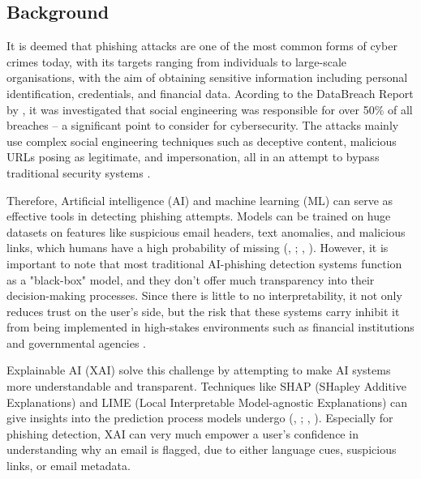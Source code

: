 
\subsection{Background}

It is deemed that phishing attacks are one of the most common forms of cyber crimes today, with its targets ranging from individuals to large-scale organisations, with the aim of obtaining sensitive information including personal identification, credentials, and financial data. Acording to the DataBreach Report by \cite{verizon2023}, it was investigated that social engineering was responsible for over 50\% of all breaches -- a significant point to consider for cybersecurity. The attacks mainly use complex social engineering techniques such as deceptive content, malicious URLs posing as legitimate, and impersonation, all in an attempt to bypass traditional security systems \citep{marett2009effectiveness}. \newline

\noindent Therefore, Artificial intelligence (AI) and machine learning (ML) can serve as effective tools in detecting phishing attempts. Models can be trained on huge datasets on features like suspicious email headers, text anomalies, and malicious links, which humans have a high probability of missing (\citeauthor{chandrasekaran2006phoney}, \citeyear{chandrasekaran2006phoney}; \citeauthor{jain2022survey}, \citeyear{jain2022survey}). However, it is important to note that most traditional AI-phishing detection systems function as a "black-box" model, and they don't offer much transparency into their decision-making processes. Since there is little to no interpretability, it not only reduces trust on the user's side, but the risk that these systems carry inhibit it from being implemented in high-stakes environments such as financial institutions and governmental agencies \citep{ribeiro2016model}. \newline

\noindent Explainable AI (XAI) solve this challenge by attempting to make AI systems more understandable and transparent. Techniques like SHAP (SHapley Additive Explanations) and LIME (Local Interpretable Model-agnostic Explanations) can give insights into the prediction process models undergo (\citeauthor{lundberg2017unified}, \citeyear{lundberg2017unified}; \citeauthor{ribeiro2016model}, \citeyear{ribeiro2016model}). Especially for phishing detection, XAI can very much empower a user's confidence in understanding why an email is flagged, due to either language cues, suspicious links, or email metadata. \newline

